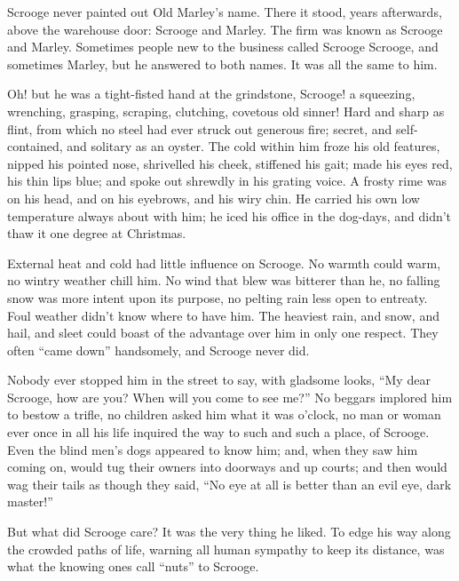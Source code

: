 \documentclass[paper=5.5in:8.5in,BCOR=7mm,twoside,DIV=calc,12pt,usegeometry]{scrbook} %
\begin{document}
Scrooge never painted out Old Marley's name. There it stood, years afterwards, above the warehouse door: Scrooge and Marley. The firm was known as Scrooge and Marley. Sometimes people new to the business called Scrooge Scrooge, and sometimes Marley, but he answered to both names. It was all the same to him.

Oh! but he was a tight-fisted hand at the grindstone, Scrooge! a squeezing, wrenching, grasping, scraping, clutching, covetous old sinner! Hard and sharp as flint, from which no steel had ever struck out generous fire; secret, and self-contained, and solitary as an oyster. The cold within him froze his old features, nipped his pointed nose, shrivelled his cheek, stiffened his gait; made his eyes red, his thin lips blue; and spoke out shrewdly in his grating voice. A frosty rime was on his head, and on his eyebrows, and his wiry chin. He carried his own low temperature always about with him; he iced his office in the dog-days, and didn't thaw it one degree at Christmas.

External heat and cold had little influence on Scrooge. No \newline warmth could warm, no wintry weather chill him. No wind that blew was bitterer than he, no falling snow was more intent upon its purpose, no pelting rain less open to entreaty. Foul weather didn't know where to have him. The heaviest rain, and snow, and hail, and sleet could boast of the advantage over him in only one respect. They often \enquote{came down} handsomely, and Scrooge never did.

Nobody ever stopped him in the street to say, with gladsome looks, \enquote{My dear Scrooge, how are you? When will you come to see me?} No beggars implored him to bestow a trifle, no children asked him what it was o'clock, no man or woman ever once in all his life inquired the way to such and such a place, of Scrooge. Even the blind men's dogs appeared to know him; and, when they saw him coming on, would tug their owners into doorways and up courts; and then would wag their tails as though they said, \enquote{No eye at all is better than an evil eye, dark master!}

But what did Scrooge care? It was the very thing he liked. To edge his way along the crowded paths of life, warning all human sympathy to keep its distance, was what the knowing ones call \enquote{nuts} to Scrooge.
\end{document}
